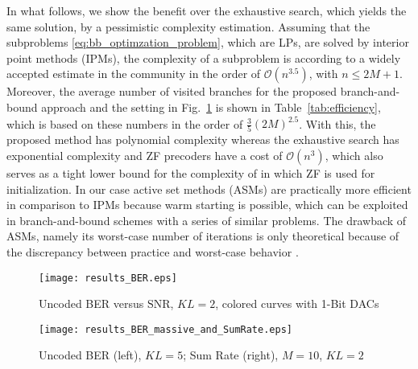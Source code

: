 \documentclass[journal,comsoc]{IEEEtran}
\begin{document}
In what follows, we show the benefit over the exhaustive search, which yields the same solution, by a pessimistic complexity estimation.
Assuming that the subproblems \eqref{eq:bb_optimzation_problem}, which are LPs, are solved by interior point methods (IPMs), the complexity of a subproblem is according to a widely accepted estimate in the community \cite{boyd_2004} in the order of $\mathcal{O}(n^{3.5})$, with $n\leq2M+1$.
Moreover, the average number of visited branches for the proposed branch-and-bound approach and the setting in Fig.~\ref{fig:BER_1} is shown in Table~\ref{tab:efficiency}, which is based on these numbers in the order of $\frac{3}{5}(2 M)^{2.5} $.
With this, the proposed method has polynomial complexity whereas the exhaustive search has exponential complexity and ZF precoders have a cost of $\mathcal{O}(n^{3})$, which also serves as a tight lower bound for the complexity of \cite{Jedda_2016} in which ZF is used for initialization. 
In our case active set methods (ASMs) are practically more efficient in comparison to IPMs because warm starting is possible, which can be exploited in branch-and-bound schemes with a series of similar problems.
The drawback of ASMs, namely its worst-case number of iterations is only theoretical because of the discrepancy between practice and worst-case behavior \cite{Borgwardt_1987}.
\begin{figure}
\begin{center}
\texttt{[image: results\_BER.eps]}
\captionsetup{justification=centering}
\caption{Uncoded BER versus $\mathrm{SNR}$, $K L=2$, colored curves with 1-Bit DACs } 
\label{fig:BER_1}       %
\vspace{-1em}
\end{center}
\end{figure}
\begin{figure}
\begin{center}
\texttt{[image: results\_BER\_massive\_and\_SumRate.eps]}%
\captionsetup{justification=centering}
\caption{Uncoded BER (left), $K L=5$; Sum Rate (right), $M=10$, $K L=2$} 
\label{fig:BER_2}       %
\vspace{-1em}
\end{center}
\end{figure}
\end{document}
